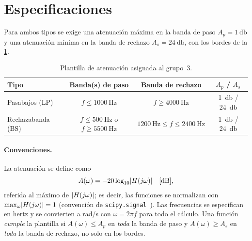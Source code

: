 \section{Especificaciones}
\label{sec:especificaciones}

Para ambos tipos se exige una atenuación máxima en la banda de paso $A_p = \qty{1}{\decibel}$ y una atenuación mínima en la banda de
rechazo $A_s = \qty{24}{\decibel}$, con los bordes de la \cref{tab:especificaciones}.

\begin{table}[H]
  \centering
  \caption{Plantilla de atenuación asignada al grupo~3.}
  \label{tab:especificaciones}
  \begin{tabular}{@{}lccc@{}}
    \toprule
    Tipo & Banda(s) de paso & Banda de rechazo & $A_p$ / $A_s$ \\
    \midrule
    Pasabajos (LP)     & $f \le \qty{1000}{\hertz}$ & $f \ge \qty{4000}{\hertz}$ & \qty{1}{\decibel} / \qty{24}{\decibel} \\
    Rechazabanda (BS)  & $f \le \qty{500}{\hertz}$ \;o\; $f \ge \qty{5500}{\hertz}$ & $\qty{1200}{\hertz} \le f \le \qty{2400}{\hertz}$ & \qty{1}{\decibel} / \qty{24}{\decibel} \\
    \bottomrule
  \end{tabular}
\end{table}

\paragraph{Convenciones.} La atenuación se define como
\begin{equation}
  A(\omega) = -20\log_{10}\lvert H(j\omega)\rvert \quad [\mathrm{dB}],
  \label{eq:atenuacion}
\end{equation}
referida al máximo de $\lvert H(j\omega)\rvert$; es decir, las funciones se normalizan con $\max_\omega \lvert H(j\omega)\rvert = 1$ (convención
de \texttt{scipy.signal}~\cite{virtanen2020}). Las frecuencias se especifican en hertz y se convierten a rad/s con $\omega = 2\pi f$ para
todo el cálculo. Una función \emph{cumple} la plantilla si $A(\omega) \le A_p$ en \emph{toda} la banda de paso y $A(\omega) \ge A_s$ en
\emph{toda} la banda de rechazo, no solo en los bordes.
